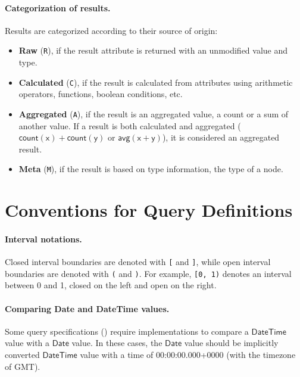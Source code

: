 \paragraph{Categorization of results.} Results are categorized according to their source of origin:

\begin{itemize}
	\item \textbf{Raw} (\texttt{R}), if the result attribute is returned with an unmodified value and type.
	\item \textbf{Calculated} (\texttt{C}), if the result is calculated from attributes using arithmetic operators, functions, boolean conditions, etc.
	\item \textbf{Aggregated} (\texttt{A}), if the result is an aggregated value, \eg a count or a sum of another value. If a result is both calculated and aggregated (\eg $\mathsf{count(x) + count(y)}$ or $\mathsf{avg(x + y)}$), it is considered an aggregated result.
	\item \textbf{Meta} (\texttt{M}), if the result is based on type information, \eg the type of a node.
\end{itemize}



\section{Conventions for Query Definitions}

\paragraph{Interval notations.} Closed interval boundaries are denoted with 
\texttt{[} 
and \texttt{]}, while open interval boundaries are denoted with \texttt{(} and 
\texttt{)}. For example, \texttt{[0, 1)} denotes an interval between 0 and 1, 
closed on the left and open on the right.

\paragraph{Comparing Date and DateTime values.}

Some query specifications (\eg {}) require implementations to compare a
$\mathsf{DateTime}$ value with a $\mathsf{Date}$ value. In these cases, the 
$\mathsf{Date}$ value should be implicitly converted $\mathsf{DateTime}$ value 
with a time of 00:00:00.000+0000 (\ie with the timezone of GMT).

